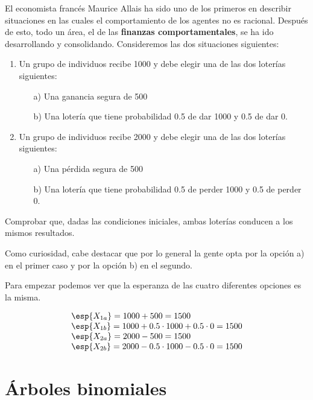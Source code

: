 \begin{problem}[7]
El economista francés Maurice Allais ha sido uno de los primeros en describir situaciones en las cuales el comportamiento de los agentes no es racional. Después de esto, todo un área, el de las \textbf{finanzas comportamentales}, se ha ido desarrollando y consolidando. Consideremos las dos situaciones siguientes:

\begin{enumerate}
\item Un grupo de individuos recibe 1000  y debe elegir una de las dos loterías siguientes:
\begin{enumerate}
\item[a)] Una ganancia segura de 500
\item[b)] Una lotería que tiene probabilidad 0.5 de dar 1000 y 0.5 de dar 0.
\end{enumerate}

\item Un grupo de individuos recibe 2000 y debe elegir una de las dos loterías siguientes:
\begin{enumerate}
\item[a)] Una pérdida segura de 500
\item[b)] Una lotería que tiene probabilidad 0.5 de perder 1000 y 0.5 de perder 0.
\end{enumerate}
\end{enumerate}

\ppart Comprobar que, dadas las condiciones iniciales, ambas loterías conducen a los mismos resultados.

Como curiosidad, cabe destacar que por lo general la gente opta por la opción a) en el primer caso y por la opción b) en el segundo.
\solution

Para empezar podemos ver que la esperanza de las cuatro diferentes opciones es la misma.

\[\begin{array}{l}
\esp{X_{1a}} = 1000 + 500 = 1500\\
\esp{X_{1b}} = 1000 + 0.5\cdot 1000 + 0.5 \cdot 0 = 1500 \\
\esp{X_{2a}} = 2000 - 500 = 1500 \\
\esp{X_{2b}} = 2000 - 0.5 \cdot 1000 - 0.5 \cdot 0 = 1500
\end{array}\]

\end{problem}

\section{Árboles binomiales}

